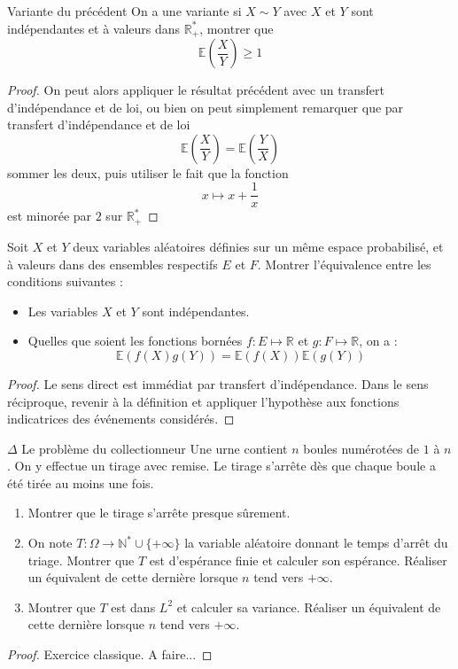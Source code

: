 \documentclass[french,a4paper]{article}
\newcommand{\N}{\mathbb{N}}
\newcommand{\R}{\mathbb{R}}
\newcommand{\st}{^*}
\newcommand{\E}{\mathbb{E}}
\theoremstyle{plain}
\theoremstyle{definition}
\theoremstyle{remark}
\begin{document}
\begin{ex}{Variante du précédent}
	On a une variante si $X\sim Y$ avec $X$ et $Y$ sont indépendantes et à valeurs dans $\R_+\st$, montrer que $$\E\left(\frac{X}{Y}\right)\geqslant1$$
\end{ex}
\begin{proof}
	On peut alors appliquer le résultat précédent avec un transfert d'indépendance et de loi, ou bien on peut simplement remarquer que par transfert d'indépendance et de loi $$\E\left(\frac{X}{Y}\right)=\E\left(\frac{Y}{X}\right)$$ sommer les deux, puis utiliser le fait que la fonction $$x\mapsto x+\frac{1}{x}$$ est minorée par $2$ sur $\R_+\st$
\end{proof}

\begin{ex}{}
	Soit $X$ et $Y$ deux variables aléatoires définies sur un même espace probabilisé, et à valeurs dans des ensembles respectifs $E$ et $F$. Montrer l'équivalence entre les conditions suivantes :
	\begin{itemize}
		\item Les variables $X$ et $Y$ sont indépendantes.
		\item Quelles que soient les fonctions bornées $f:E\mapsto \R$ et $g:F\mapsto\R$, on a : $$\E(f(X)g(Y))=\E(f(X))\E(g(Y))$$
	\end{itemize}
\end{ex}
\begin{proof}
	Le sens direct est immédiat par transfert d'indépendance. Dans le sens réciproque, revenir à la définition et appliquer l'hypothèse aux fonctions indicatrices des événements considérés.
\end{proof}

\begin{ex}{$\Delta$ Le problème du collectionneur}
	Une urne contient $n$ boules numérotées de $1$ à $n$. On y effectue un tirage avec remise. Le tirage s'arrête dès que chaque boule a été tirée au moins une fois.
	\begin{enumerate}
		\item Montrer que le tirage s'arrête presque sûrement.
		\item On note $T:\Omega\to\N\st\cup\{+\infty\}$ la variable aléatoire donnant le temps d'arrêt du triage. Montrer que $T$ est d'espérance finie et calculer son espérance. Réaliser un équivalent de cette dernière lorsque $n$ tend vers $+\infty$.
		\item Montrer que $T$ est dans $L^2$ et calculer sa variance. Réaliser un équivalent de cette dernière lorsque $n$ tend vers $+\infty$.
	\end{enumerate}
\end{ex}
\begin{proof}
	Exercice classique. A faire...
\end{proof}
\end{document}
